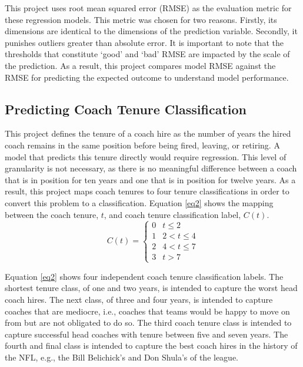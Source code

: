 \documentclass[conference]{IEEEtran}
\begin{document}
This project uses root mean squared error (RMSE) as the evaluation metric for these regression models. This metric was chosen for two reasons. Firstly, its dimensions are identical to the dimensions of the prediction variable. Secondly, it punishes outliers greater than absolute error. It is important to note that the thresholds that constitute `good' and `bad' RMSE are impacted by the scale of the prediction. As a result, this project compares model RMSE against the RMSE for predicting the expected outcome to understand model performance. 


\subsection{Predicting Coach Tenure Classification}
This project defines the tenure of a coach hire as the number of years the hired coach remains in the same position before being fired, leaving, or retiring. A model that predicts this tenure directly would require regression. This level of granularity is not necessary, as there is no meaningful difference between a coach that is in position for ten years and one that is in position for twelve years. As a result, this project maps coach tenures to four tenure classifications in order to convert this problem to a classification. Equation \eqref{eq2} shows the mapping between the coach tenure, $t$, and coach tenure classification label, $C(t)$.
\begin{equation}
        C(t)=
        \begin{cases}
            0 &t \leq 2 		\\
            1 &2 < t \leq 4 \\
            2 &4 < t \leq 7 \\
            3 &t > 7
        \end{cases}
        \label{eq2}
\end{equation}

Equation \eqref{eq2} shows four independent coach tenure classification labels. The shortest tenure class, of one and two years, is intended to capture the worst head coach hires. The next class, of three and four years, is intended to capture coaches that are mediocre, i.e., coaches that teams would be happy to move on from but are not obligated to do so. The third coach tenure class is intended to capture successful head coaches with tenure between five and seven years. The fourth and final class is intended to capture the best coach hires in the history of the NFL, e.g., the Bill Belichick's and Don Shula's of the league.
\end{document}
